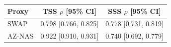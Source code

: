 \begin{tabular}{lcc}
\toprule
Proxy & TSS $\rho$ [95\% CI] & SSS $\rho$ [95\% CI] \\
\midrule
SWAP & 0.798 [0.766, 0.825] & 0.778 [0.731, 0.819] \\
AZ-NAS & 0.922 [0.910, 0.931] & 0.740 [0.692, 0.779] \\
\bottomrule
\end{tabular}
